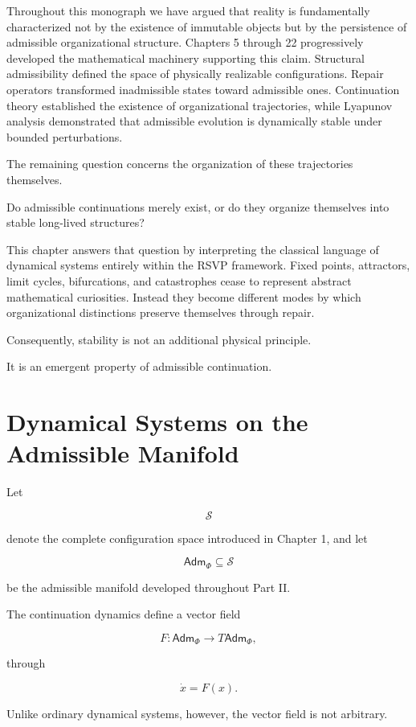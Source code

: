 \documentclass[11pt,oneside]{book}
\numberwithin{equation}{chapter}
\theoremstyle{definition}
\theoremstyle{plain}
\newcommand{\State}{\mathcal{S}}
\newcommand{\Adm}{\mathsf{Adm}}
\begin{document}
Throughout this monograph we have argued that reality is fundamentally
characterized not by the existence of immutable objects but by the
persistence of admissible organizational structure. Chapters 5 through 22
progressively developed the mathematical machinery supporting this claim.
Structural admissibility defined the space of physically realizable
configurations. Repair operators transformed inadmissible states toward
admissible ones. Continuation theory established the existence of
organizational trajectories, while Lyapunov analysis demonstrated that
admissible evolution is dynamically stable under bounded perturbations.

The remaining question concerns the organization of these trajectories
themselves.

Do admissible continuations merely exist, or do they organize themselves
into stable long-lived structures?

This chapter answers that question by interpreting the classical language of
dynamical systems entirely within the RSVP framework. Fixed points,
attractors, limit cycles, bifurcations, and catastrophes cease to represent
abstract mathematical curiosities. Instead they become different modes by
which organizational distinctions preserve themselves through repair.

Consequently, stability is not an additional physical principle.

It is an emergent property of admissible continuation.

\section{Dynamical Systems on the Admissible Manifold}

Let

\[
\State
\]

denote the complete configuration space introduced in Chapter 1, and let

\[
\Adm_\Phi
\subseteq
\State
\]

be the admissible manifold developed throughout Part II.

The continuation dynamics define a vector field

\[
F:
\Adm_\Phi
\rightarrow
T\Adm_\Phi,
\]

through

\[
\dot{x}
=
F(x).
\]

Unlike ordinary dynamical systems, however, the vector field is not
arbitrary.
\end{document}
